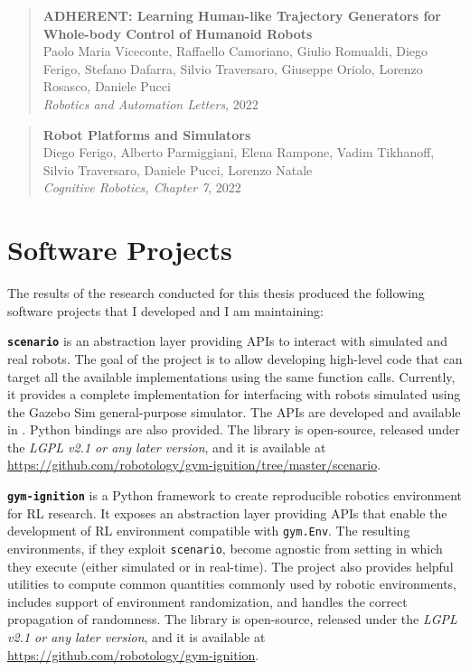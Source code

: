 \begin{quote}
    \textbf{ADHERENT: Learning Human-like Trajectory Generators for Whole-body Control of Humanoid Robots} \\
    Paolo Maria Viceconte, Raffaello Camoriano, Giulio Romualdi, Diego Ferigo, Stefano Dafarra, Silvio Traversaro, Giuseppe Oriolo, Lorenzo Rosasco, Daniele Pucci \\
    \textit{Robotics and Automation Letters}, 2022
\end{quote}

\begin{quote}
    \textbf{Robot Platforms and Simulators} \\
    Diego Ferigo, Alberto Parmiggiani, Elena Rampone, Vadim Tikhanoff, Silvio Traversaro, Daniele Pucci, Lorenzo Natale \\
    \textit{Cognitive Robotics, Chapter 7}, 2022
\end{quote}

\section*{Software Projects}

The results of the research conducted for this thesis produced the following software projects that I developed and I am maintaining:

\vspace{3mm}
\noindent
\textbf{\texttt{scenario}} is an abstraction layer providing \acp{API} to interact with simulated and real robots. The goal of the project is to allow developing high-level code that can target all the available implementations using the same function calls. Currently, it provides a complete implementation for interfacing with robots simulated using the Gazebo Sim general-purpose simulator. The \acp{API} are developed and available in \cpp. Python bindings are also provided. The library is open-source, released under the \emph{LGPL v2.1 or any later version}, and it is available at \url{https://github.com/robotology/gym-ignition/tree/master/scenario}.

\vspace{3mm}
\noindent
\textbf{\texttt{gym-ignition}} is a Python framework to create reproducible robotics environment for \ac{RL} research. It exposes an abstraction layer providing \acp{API} that enable the development of \ac{RL} environment compatible with \texttt{gym.Env}. The resulting environments, if they exploit \texttt{scenario},  become agnostic from setting in which they execute (either simulated or in real-time). The project also provides helpful utilities to compute common quantities commonly used by robotic environments, includes support of environment randomization, and handles the correct propagation of randomness. The library is open-source, released under the \emph{LGPL v2.1 or any later version}, and it is available at \url{https://github.com/robotology/gym-ignition}.

